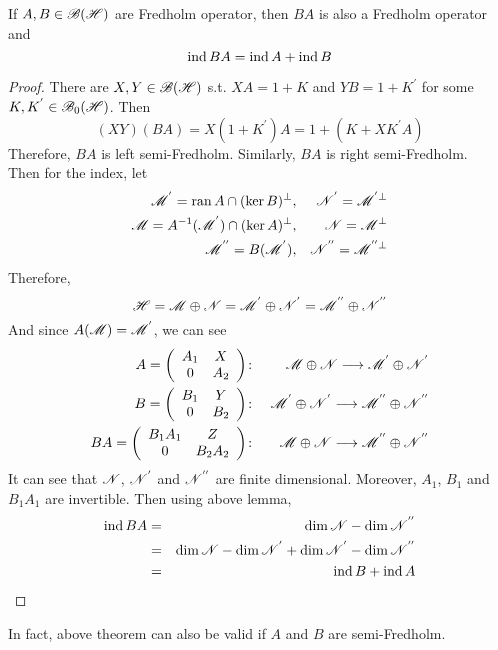 \documentclass[a4paper,11pt]{report}
\begin{document}
\begin{thm}
	If $A,B \in \mathscr{B(H)}$ are Fredholm operator, then $BA$ is also a Fredholm operator and
	\begin{equation*}
		\operatorname{ind}{BA} = \operatorname{ind}{A} + \operatorname{ind}{B}
	\end{equation*}
\end{thm}
\begin{proof}
	There are $X,Y \in \mathscr{B(H)}$ s.t. $XA = 1+K$ and $YB=1+K^{'}$ for some $K,K^{'} \in \mathscr{B}_{0}\mathscr{(H)}$. Then 
	\begin{equation*}
		(XY)(BA) = X(1+K^{'})A = 1 + (K+XK^{'}A)
	\end{equation*}
	Therefore, $BA$ is left semi-Fredholm. Similarly, $BA$ is right semi-Fredholm.\\
	Then for the index, let
	\begin{eqnarray*}
		\mathscr{M}^{'} = \operatorname{ran}{A} \cap (\ker{B})^{\bot} &,& \mathscr{N}^{'} = \mathscr{M}^{' \bot} \\
		\mathscr{M} = A^{-1}(\mathscr{M}^{'}) \cap (\ker{A})^{\bot} &,& \mathscr{N} = \mathscr{M}^{\bot} \\
		\mathscr{M}^{''} = B(\mathscr{M}^{'}) &,& \mathscr{N^{''}} = \mathscr{M}^{'' \bot}
	\end{eqnarray*}
	Therefore,
	\begin{equation*}
		\mathscr{H} = \mathscr{M} \oplus \mathscr{N} = \mathscr{M}^{'} \oplus \mathscr{N^{'}} = \mathscr{M}^{''} \oplus \mathscr{N^{''}}
	\end{equation*}
	And since $A(\mathscr{M}) = \mathscr{M}^{'}$, we can see
	\begin{eqnarray*}
		A = \left(
			\begin{array}{cc}
				A_1 & X \\
				0 & A_2
			\end{array}
		\right)
		&\colon& \mathscr{M} \oplus \mathscr{N} \longrightarrow \mathscr{M}^{'} \oplus \mathscr{N^{'}} \\
		B = \left(
			\begin{array}{cc}
				B_1 & Y \\
				0 & B_2
			\end{array}
		\right)
		&\colon& \mathscr{M}^{'} \oplus \mathscr{N^{'}} \longrightarrow \mathscr{M}^{''} \oplus \mathscr{N^{''}} \\
		BA = \left(
			\begin{array}{cc}
				B_1A_1 & Z \\
				0 & B_2A_2
			\end{array}
		\right)
		&\colon& \mathscr{M} \oplus \mathscr{N} \longrightarrow \mathscr{M}^{''} \oplus \mathscr{N^{''}}
	\end{eqnarray*}
	It can see that $\mathscr{N}$, $\mathscr{N^{'}}$ and $\mathscr{N^{''}}$ are finite dimensional. Moreover, $A_1$, $B_1$ and $B_1A_1$ are invertible. Then using above lemma,
	\begin{eqnarray*}
		\operatorname{ind}{BA} &=& \dim{\mathscr{N}} - \dim{\mathscr{N^{''}}} \\
		&=& \dim{\mathscr{N}} - \dim{\mathscr{N^{'}}} + \dim{\mathscr{N^{'}}} - \dim{\mathscr{N^{''}}} \\
		&=& \operatorname{ind}{B} + \operatorname{ind}{A}
	\end{eqnarray*}
\end{proof}
\begin{rem}
	In fact, above theorem can also be valid if $A$ and $B$ are semi-Fredholm.
\end{rem}
\end{document}
